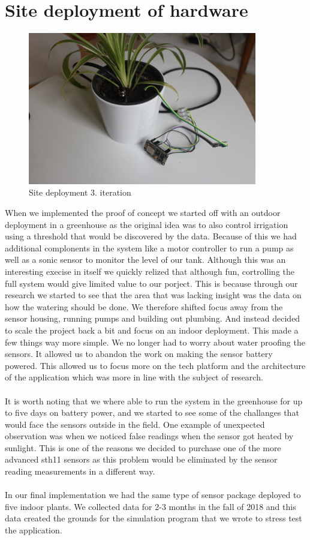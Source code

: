 \documentclass[]{uiophd}
\begin{document}
\section{Site deployment of hardware}
 \begin{figure}[h]
\caption{Site deployment 3. iteration}
\centering
\includegraphics[width=10cm]{mcu+sensor.jpg}
\end{figure}

When we implemented the proof of concept we started off with an outdoor deployment in a greenhouse as the original idea was to also control irrigation using a threshold that would be discovered by the data. Because of this we had additional complonents in the system like a motor controller to run a pump as well as a sonic sensor to monitor the level of our tank. Although this was an interesting execise in itself we quickly relized that although fun, cortrolling the full system would give limited value to our porject. This is because through our research we started to see that the area that was lacking insight was the data on how the watering should be done. We therefore shifted focus away from the sensor housing, running pumps and building out plumbing. And instead decided to scale the project back a bit and focus on an indoor deployment. This made a few things way more simple. We no longer had to worry about water proofing the sensors. It allowed us to abandon the work on making the sensor battery powered. This allowed us to focus more on the tech platform and the architecture of the application which was more in line with the subject of research. 
\\\\
It is worth noting that we where able to run the system in the greenhouse for up to five days on battery power, and we started to see some of the challanges that would face the sensors outside in the field. One example of unexpected observation was when we noticed false readings when the sensor got heated by sunlight. This is one of the reasons we decided to purchase one of the more advanced sth11 sensors as this problem would be eliminated by the sensor reading measurements in a different way.
\\\\
In our final implementation we had the same type of sensor package deployed to five indoor plants. We collected data for 2-3 months in the fall of 2018 and this data created the grounds for the simulation program that we wrote to stress test the application.
\\\\
\end{document}
